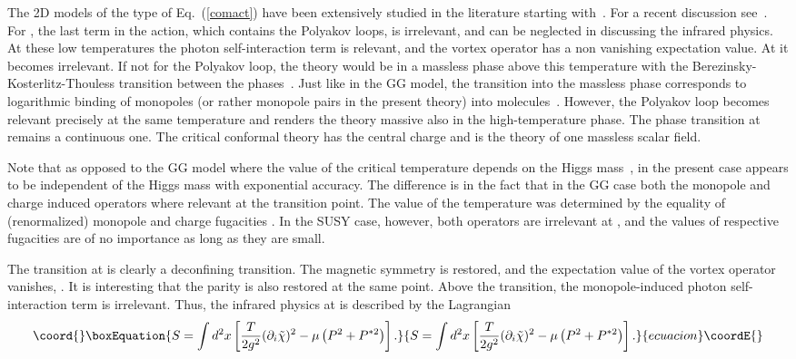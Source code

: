 \documentclass[a4paper,12pt]{article}
\begin{document}
The 2D models of the type of Eq.~(\ref{comact}) have been
extensively studied in the literature starting with~\cite{jose}.
For a recent discussion see~\cite{dorey}. For \coordHE{},
the last term in the action, which contains the Polyakov loops, is
irrelevant, and can be neglected in discussing the infrared
physics. At these low temperatures the photon self-interaction
term \coordHE{} is relevant, and the vortex operator has a non
vanishing expectation value. At \coordHE{} it becomes
irrelevant. If not for the Polyakov loop, the theory would be in a
massless phase above this temperature with the
Berezinsky-Kosterlitz-Thouless transition between the
phases~\cite{bkt}. Just like in the GG model, the transition into
the massless phase corresponds to logarithmic binding of monopoles
(or rather monopole pairs in the present theory) into
molecules~\cite{nk}. However, the Polyakov loop becomes relevant
precisely at the same temperature \coordHE{} and renders the theory
massive also in the high-temperature phase. The phase transition
at \coordHE{} remains a continuous one. The critical conformal theory
has the central charge \coordHE{} and is the theory of one massless
scalar field.

Note that as opposed to the GG model where the value of the
critical temperature depends on the Higgs mass~\cite{2, sk}, in
the present case \coordHE{} appears to be independent of the Higgs mass
with exponential accuracy. The difference is in the fact that in
the GG case both the monopole and charge induced operators where
relevant at the transition point. The value of the temperature was
determined by the equality of (renormalized) monopole and charge
fugacities \cite{sk}. In the SUSY case, however, both operators
are irrelevant at \coordHE{}, and the values of respective fugacities
are of no importance as long as they are small.

The transition at \coordHE{} is clearly a deconfining transition. The
magnetic \coordHE{} symmetry is restored, and the expectation value of
the vortex operator vanishes, \coordHE{}. It is
interesting that the parity is also restored at the same point.
Above the transition, the monopole-induced photon self-interaction
term is irrelevant. Thus, the infrared physics at \coordHE{} is
described by the Lagrangian
\begin{equation}\coord{}\boxEquation{ S=  \int d^2x\left[\frac{T}{2g^2}(\partial_i\tilde\chi)^2
- \mu\left(P^2+P^{*2}\right) \right].\label{hight}}{ S=  \int d^2x\left[\frac{T}{2g^2}(\partial_i\tilde\chi)^2
- \mu\left(P^2+P^{*2}\right) \right].}{ecuacion}\coordE{}\end{equation}
\end{document}
